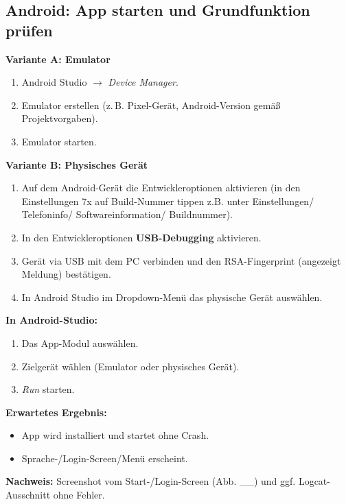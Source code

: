 \subsection{Android: App starten und Grundfunktion prüfen}

\textbf{Variante A: Emulator}
\begin{enumerate}
  \item Android Studio $\rightarrow$ \emph{Device Manager}.
  \item Emulator erstellen (z.\,B. Pixel-Gerät, Android-Version gemäß Projektvorgaben).
  \item Emulator starten.
\end{enumerate}

\textbf{Variante B: Physisches Gerät}
\begin{enumerate}
	\item Auf dem Android-Gerät die Entwickleroptionen aktivieren (in den Einstellungen 7x auf \glqq Build-Nummer\grqq{} tippen z.B. unter Einstellungen/ Telefoninfo/ Softwareinformation/ Buildnummer).
	\item In den Entwickleroptionen \textbf{USB-Debugging} aktivieren.
	\item Gerät via USB mit dem PC verbinden und den RSA-Fingerprint (angezeigt Meldung) bestätigen.
	\item In Android Studio im Dropdown-Menü das physische Gerät auswählen.
\end{enumerate}

\textbf{In Android-Studio:}

\begin{enumerate}
  \item Das App-Modul auswählen.
  \item Zielgerät wählen (Emulator oder physisches Gerät).
  \item \emph{Run} starten.
\end{enumerate}

\textbf{Erwartetes Ergebnis:}
\begin{itemize}
  \item App wird installiert und startet ohne Crash.
  \item Sprache-/Login-Screen/Menü erscheint.
\end{itemize}

\textbf{Nachweis:} Screenshot vom Start-/Login-Screen (Abb. \_\_) und ggf. Logcat-Ausschnitt ohne Fehler.

\medskip

